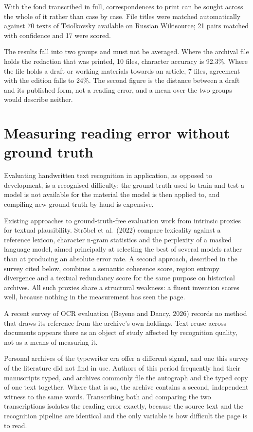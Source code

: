 \documentclass[11pt,a4paper]{article}
\begin{document}
With the fond transcribed in full, correspondences to print can be sought
across the whole of it rather than case by case. File titles were matched
automatically against 70 texts of Tsiolkovsky available on Russian Wikisource;
21 pairs matched with confidence and 17 were scored.

The results fall into two groups and must not be averaged. Where the archival
file holds the redaction that was printed, 10 files, character accuracy is
92.3\%. Where the file holds a draft or working materials towards an article, 7
files, agreement with the edition falls to 24\%. The second figure is the
distance between a draft and its published form, not a reading error, and a
mean over the two groups would describe neither.

\section{Measuring reading error without ground truth}\label{measuring-reading-error-without-ground-truth}

Evaluating handwritten text recognition in application, as opposed to
development, is a recognised difficulty: the ground truth used to train and
test a model is not available for the material the model is then applied to,
and compiling new ground truth by hand is expensive.

Existing approaches to ground-truth-free evaluation work from intrinsic
proxies for textual plausibility. Ströbel et al.~(2022) compare lexicality
against a reference lexicon, character n-gram statistics and the perplexity of
a masked language model, aimed principally at selecting the best of several
models rather than at producing an absolute error rate. A second approach,
described in the survey cited below, combines a semantic coherence score,
region entropy divergence and a textual redundancy score for the same purpose
on historical archives. All such proxies share a structural weakness: a fluent
invention scores well, because nothing in the measurement has seen the page.

A recent survey of OCR evaluation (Beyene and Dancy, 2026) records no method
that draws its reference from the archive's own holdings. Text reuse across
documents appears there as an object of study affected by recognition quality,
not as a means of measuring it.

Personal archives of the typewriter era offer a different signal, and one this
survey of the literature did not find in use. Authors of this period
frequently had their manuscripts typed, and archives commonly file the
autograph and the typed copy of one text together. Where that is so, the
archive contains a second, independent witness to the same words. Transcribing
both and comparing the two transcriptions isolates the reading error exactly,
because the source text and the recognition pipeline are identical and the
only variable is how difficult the page is to read.
\end{document}
